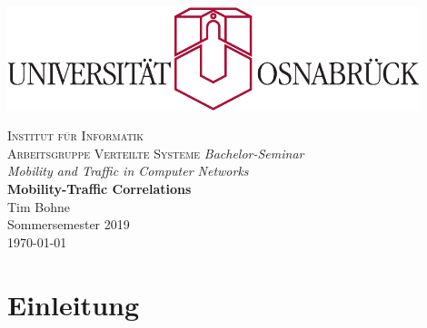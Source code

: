 \documentclass[12pt, a4paper]{article}
\begin{document}

\begin{titlepage}
\centering
\thispagestyle{empty}
\begin{center}
\includegraphics[width=0.9\textwidth]{uos.pdf}
\end{center}
\LARGE{\textsc{Institut für Informatik\\Arbeitsgruppe Verteilte Systeme}}
\vfill
\LARGE{\emph{Bachelor-Seminar}}\\
\LARGE{\emph{Mobility and Traffic in Computer Networks}}\\
\vspace{8mm}
\huge{\textbf{{\selectfont
Mobility-Traffic Correlations}}}\\
\vspace{9mm}
\LARGE{Tim Bohne}\\
\vspace{0.2cm}
\vspace{4cm}
\large{Sommersemester 2019}\\
\vspace{0.2cm}
\large{\today}
\vfill
\end{titlepage}
\newpage

\tableofcontents
\newpage

\pagestyle{plain}

\section{Einleitung}
\end{document}
